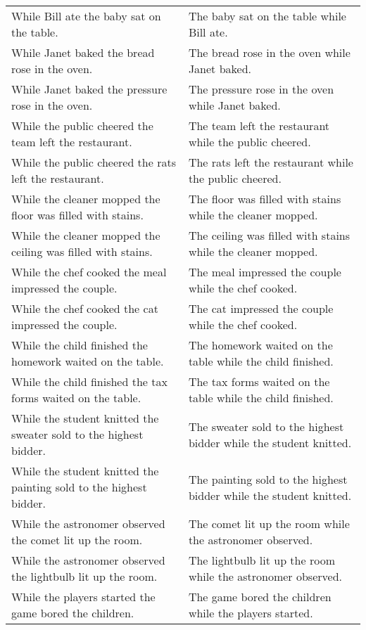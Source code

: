 \begin{center}
\begin{xtabular*}{\textwidth}{p{0.45\textwidth}|p{0.45\textwidth}}
        While Bill ate the baby sat on the table. & The baby sat on the table while Bill ate. \\
        While Janet baked the bread rose in the oven. & The bread rose in the oven while Janet baked. \\
        While Janet baked the pressure rose in the oven. & The pressure rose in the oven while Janet baked. \\
        While the public cheered the team left the restaurant. & The team left the restaurant while the public cheered. \\
        While the public cheered the rats left the restaurant. & The rats left the restaurant while the public cheered. \\
        While the cleaner mopped the floor was filled with stains. & The floor was filled with stains while the cleaner mopped. \\
        While the cleaner mopped the ceiling was filled with stains. & The ceiling was filled with stains while the cleaner mopped. \\
        While the chef cooked the meal impressed the couple. & The meal impressed the couple while the chef cooked. \\
        While the chef cooked the cat impressed the couple. & The cat impressed the couple while the chef cooked. \\
        While the child finished the homework waited on the table. & The homework waited on the table while the child finished. \\
        While the child finished the tax forms waited on the table. & The tax forms waited on the table while the child finished. \\
        While the student knitted the sweater sold to the highest bidder. & The sweater sold to the highest bidder while the student knitted. \\
        While the student knitted the painting sold to the highest bidder. & The painting sold to the highest bidder while the student knitted. \\
        While the astronomer observed the comet lit up the room. & The comet lit up the room while the astronomer observed. \\
        While the astronomer observed the lightbulb lit up the room. & The lightbulb lit up the room while the astronomer observed. \\
        While the players started the game bored the children. & The game bored the children while the players started. \\

\end{xtabular*}
\end{center}
